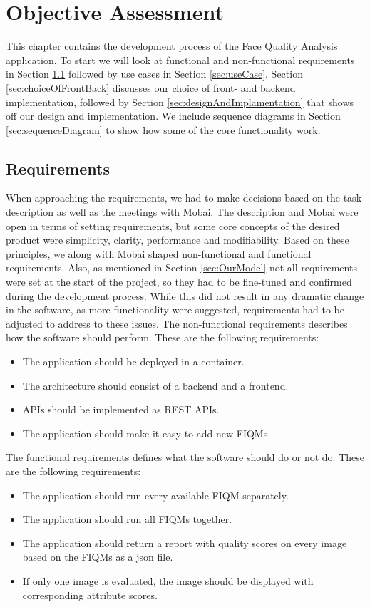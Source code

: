 \chapter{Objective Assessment}
\label{chap:objective}
This chapter contains the development process of the Face Quality Analysis application. To start we will look at functional and non-functional requirements in Section \ref{sec:requirements} followed by use cases in Section \ref{sec:useCase}. Section \ref{sec:choiceOfFrontBack} discusses our choice of front- and backend implementation, followed by Section \ref{sec:designAndImplamentation} that shows off our design and implementation. We include sequence diagrams in Section \ref{sec:sequenceDiagram} to show how some of the core functionality work.

\section{Requirements}
\label{sec:requirements}
When approaching the requirements, we had to make decisions based on the task description as well as the meetings with Mobai. The description and Mobai were open in terms of setting requirements, but some core concepts of the desired product were simplicity, clarity, performance and modifiability. Based on these principles, we along with Mobai shaped non-functional and functional requirements. Also, as mentioned in Section \ref{sec:OurModel} not all requirements were set at the start of the project, so they had to be fine-tuned and confirmed during the development process. While this did not result in any dramatic change in the software, as more functionality were suggested, requirements had to be adjusted to address to these issues. The non-functional requirements describes how the software should perform. These are the following requirements:
\begin{itemize}
    \item The application should be deployed in a container.
    \item The architecture should consist of a backend and a frontend.
    \item APIs should be implemented as REST APIs.
    \item The application should make it easy to add new FIQMs.
\end{itemize}
The functional requirements defines what the software should do or not do. These are the following requirements:
\begin{itemize}
    \item The application should run every available FIQM separately.
    \item The application should run all FIQMs together.
    \item The application should return a report with quality scores on every image based on the FIQMs as a \acrshort{json} file.
    \item If only one image is evaluated, the image should be displayed with corresponding attribute scores. 
\end{itemize}

